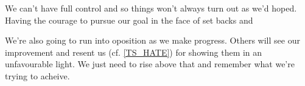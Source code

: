 \cleardoublepage
\begin{multicols}{2}

We can't have full control and so things won't always turn out as we'd hoped. Having the courage to pursue our goal in the face of set backs and 

We're also going to run into oposition as we make progress. Others will see our improvement and resent us (cf. \ref{TS_HATE}) for showing them in an unfavourable light. We just need to rise above that and remember what we're trying to acheive. 

\end{multicols}
\clearpage
